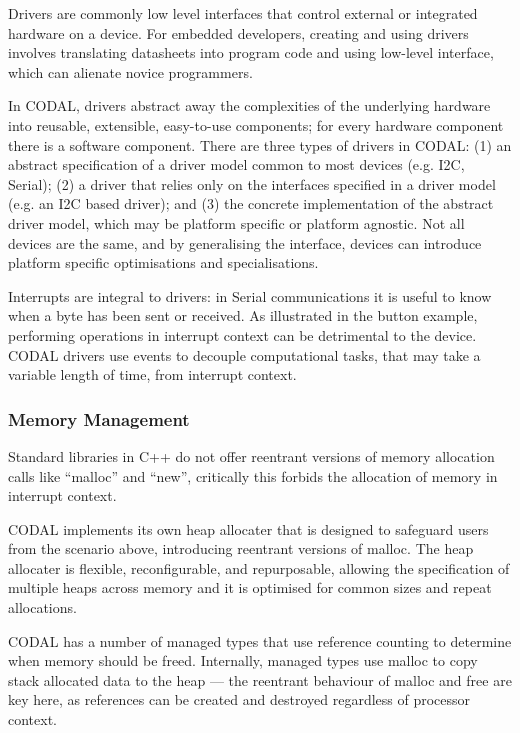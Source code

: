 Drivers are commonly low level interfaces that control external or integrated hardware on a device. For embedded developers, creating and using drivers involves translating datasheets into program code and using low-level interface, which can alienate novice programmers.

In CODAL, drivers abstract away the complexities of the underlying hardware into reusable, extensible, easy-to-use components; for every hardware component there is a software component. There are three types of drivers in CODAL: (1) an abstract specification of a driver model common to most devices (e.g. I2C, Serial); (2) a driver that relies only on the interfaces specified in a driver model  (e.g. an I2C based driver); and (3) the concrete implementation of the abstract driver model, which may be platform specific or platform agnostic. Not all devices are the same, and by generalising the interface, devices can introduce platform specific optimisations and specialisations.

Interrupts are integral to drivers: in Serial communications it is useful to know when a byte has been sent or received. As illustrated in the button example, performing operations in interrupt context can be detrimental to the device. CODAL drivers use events to decouple computational tasks, that may take a variable length of time, from interrupt context.


\subsubsection{Memory Management}

Standard libraries in C++ do not offer reentrant versions of memory allocation calls like ``malloc'' and ``new'', critically this forbids the allocation of memory in interrupt context.

CODAL implements its own heap allocater that is designed to safeguard users from the scenario above, introducing reentrant versions of malloc. The heap allocater is flexible, reconfigurable, and repurposable, allowing the specification of multiple heaps across memory and it is optimised for common sizes and repeat allocations.

CODAL has a number of managed types that use reference counting to determine when memory should be freed. Internally, managed types use malloc to copy stack allocated data to the heap --- the reentrant behaviour of malloc and free are key here, as references can be created and destroyed regardless of processor context.


